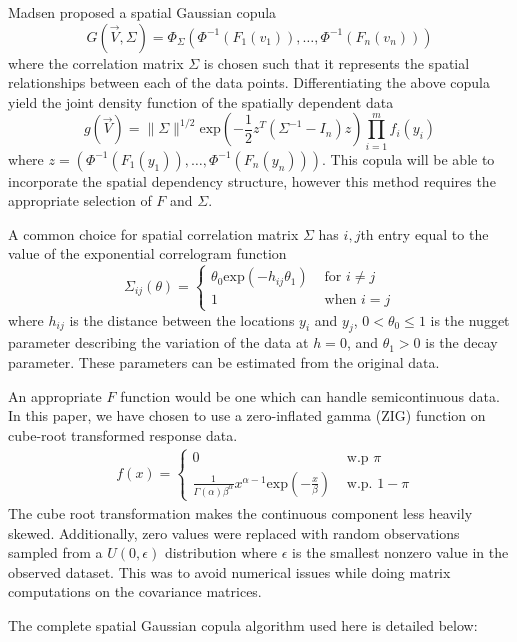 \documentclass{article}
\begin{document}
Madsen\cite{madsen09} proposed a spatial Gaussian copula
$$
G(\vec{V}, \Sigma) = \Phi_{\Sigma}(\Phi^{-1}(F_1(v_1)), \ldots, \Phi^{-1}(F_n(v_n)))
$$
where the correlation matrix $\Sigma$ is chosen such that it represents the spatial relationships between each of the data points.
Differentiating the above copula yield the joint density function of the spatially dependent data
$$
g(\vec{V}) = \| \Sigma \|^{1/2} \text{exp}\left(-\frac{1}{2} z^T (\Sigma^{-1} - I_n) z\right) \prod_{i = 1}^m f_i(y_i)
$$
where $z = (\Phi^{-1}(F_1(y_1)), \ldots, \Phi^{-1}(F_n(y_n)))$.
This copula will be able to incorporate the spatial dependency structure, however this method requires the appropriate selection of $F$ and $\Sigma$.

A common choice for spatial correlation matrix $\Sigma$ has $i,j$th entry equal to the value of the exponential correlogram function
$$
\Sigma_{ij}(\theta) = 
	\begin{cases}
		\theta_0 \text{exp}(-h_{ij} \theta_1) & \text{ for } i \neq j\\
		1 & \text{ when } i = j
	\end{cases}
$$
where $h_{ij}$ is the distance between the locations $y_i$ and $y_j$, $0 < \theta_0 \leq 1$ is the nugget parameter describing the variation of the data at $h = 0$, and $\theta_1 > 0$ is the decay parameter.
These parameters can be estimated from the original data\cite{madsen09}.

An appropriate $F$ function would be one which can handle semicontinuous data.
In this paper, we have chosen to use a zero-inflated gamma (ZIG) function on cube-root transformed response data.
\begin{align*}
&f(x) = 
\begin{cases}
	0 & \text{ w.p } \pi \\
	\frac{1}{\Gamma(\alpha) \beta^\alpha} x^{\alpha -1} \text{exp}\left(-\frac{x}{\beta}\right) & \text{ w.p. } 1 - \pi 
\end{cases} 
\end{align*}
The cube root transformation makes the continuous component less heavily skewed.
Additionally, zero values were replaced with random observations sampled from a $U(0, \epsilon)$ distribution where $\epsilon$ is the smallest nonzero value in the observed dataset.
This was to avoid numerical issues while doing matrix computations on the covariance matrices.

The complete spatial Gaussian copula algorithm used here is detailed below:
\end{document}
